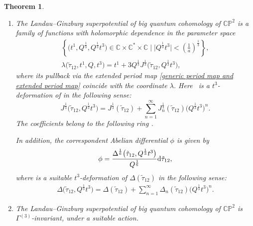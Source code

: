 \documentclass[pdftex]{sigma}
\numberwithin{equation}{section}
\newtheorem{Theorem}{Theorem}[section]
\begin{document}
\begin{Theorem}\quad
\begin{enumerate}\itemsep=0pt
\item[$(1)$] The Landau--Ginzburg superpotential of big quantum cohomology of $\mathbb{CP}^2$ is a family of functions
with holomorphic dependence in the parameter space
\begin{gather*}%
\left\{\bigl(t^1,Q^{\frac{1}{3}}, Q^{\frac{1}{3}}t^3\bigr) \in \mathbb{C}\times\mathbb{C}^{*}\times \mathbb{C}\mid \big|Q^{\frac{1}{3}}t^3\big|<\left(\frac{1}{a}\right)^{\frac{1}{3}} \right\},
\\
\lambda\bigl(\tilde\tau_{12}, t^1, Q, t^3\bigr)=t^1+3Q^{\frac{1}{3}}J^{\frac{1}{3}}\bigl(\tilde\tau_{12}, Q^{\frac{1}{3}}t^3\bigr),
\end{gather*}
where its pullback via the extended period map \eqref{generic period map and extended period map} coincide with the coordinate $\lambda$.
Here~ is a $t^3$-deformation of  in the following sense:
\[%
J^{\frac{1}{3}}\bigl(\tilde\tau_{12}, Q^{\frac{1}{3}}t^3\bigr)=J^{\frac{1}{3}}(\tilde\tau_{12})+\sum_{n=1}^{\infty}J_n^{\frac{1}{3}}(\tilde\tau_{12})\bigl( Q^{\frac{1}{3}}t^3\bigr)^n.
\]
The coefficients  belong to the following ring
.

 In addition, the correspondent Abelian differential $\phi$ is given by
\[
\phi=\frac{\Delta^{\frac{1}{6}}\bigl(\tilde\tau_{12},Q^{\frac{1}{3}}t^3\bigr)}{Q^{\frac{1}{6}}} {\rm d}\tilde\tau_{12},
\]
where  is a suitable $t^3$-deformation of $\Delta(\tilde\tau_{12})$ in the following sense:
\begin{gather*}
\Delta\bigl(\tilde\tau_{12},Q^{\frac{1}{3}}t^3\bigr)=\Delta(\tilde\tau_{12})+\sum_{n=1}^{\infty}\Delta_n(\tilde\tau_{12})\bigl( Q^{\frac{1}{3}}t^3\bigr)^n.
\end{gather*}
\item[$(2)$] The Landau--Ginzburg superpotential of big quantum cohomology of $\mathbb{CP}^2$ is $\Gamma^{(3)}$-invariant, under a suitable action.
\end{enumerate}
\end{Theorem}
\end{document}
